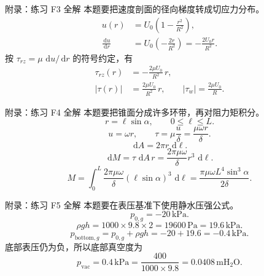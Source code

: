 \documentclass[aspectratio=169,10pt]{beamer}
\newcommand{\rd}{\,\mathrm{d}}
\begin{document}
\begin{frame}{附录：练习 F3 全解}
  \small
  本题要把速度剖面的径向梯度转成切应力分布。
  \begin{align}
    u(r)&=U_0\left(1-\frac{r^2}{R^2}\right), \tag{A9}\\
    \frac{\rd u}{\rd r}
      &=U_0\left(-\frac{2r}{R^2}\right)
       =-\frac{2U_0r}{R^2}. \tag{A10}
  \end{align}
  按 $\tau_{rz}=\mu\,\rd u/\rd r$ 的符号约定，有
  \begin{align}
    \tau_{rz}(r)&=-\frac{2\mu U_0}{R^2}\,r, \tag{A11}\\
    |\tau(r)|&=\frac{2\mu U_0}{R^2}\,r,\qquad
    |\tau_w|=\frac{2\mu U_0}{R}. \tag{A12}
  \end{align}
\end{frame}

\begin{frame}{附录：练习 F4 全解}
  本题要把锥面分成许多环带，再对阻力矩积分。
  \[
    r=\ell\sin\alpha,\qquad 0\le \ell\le L. \tag{A13}
  \]
  \[
    u=\omega r,\qquad
    \tau=\mu\frac{u}{\delta}=\frac{\mu\omega r}{\delta}. \tag{A14}
  \]
  \[
    \rd A=2\pi r\,\rd\ell. \tag{A15}
  \]
  \[
    \rd M=\tau\,\rd A\,r
    =\frac{2\pi\mu\omega}{\delta}r^3\,\rd\ell. \tag{A16}
  \]
  \[
    M=\int_0^L\frac{2\pi\mu\omega}{\delta}
       (\ell\sin\alpha)^3\,\rd\ell
     =\frac{\pi\mu\omega L^4\sin^3\alpha}{2\delta}. \tag{A17}
  \]
\end{frame}

\begin{frame}{附录：练习 F5 全解}
  本题要在表压基准下使用静水压强公式。
  \[
    p_{0,g}=-20\,\mathrm{kPa}. \tag{A18}
  \]
  \[
    \rho gh=1000\times9.8\times2
    =19600\,\mathrm{Pa}=19.6\,\mathrm{kPa}. \tag{A19}
  \]
  \[
    p_{\mathrm{bottom},g}
    =p_{0,g}+\rho gh
    =-20+19.6
    =-0.4\,\mathrm{kPa}. \tag{A20}
  \]
  底部表压仍为负，所以底部真空度为
  \[
    p_{\mathrm{vac}}=0.4\,\mathrm{kPa}
    =\frac{400}{1000\times9.8}=0.0408\,\mathrm{mH_2O}. \tag{A21}
  \]
\end{frame}
\end{document}
